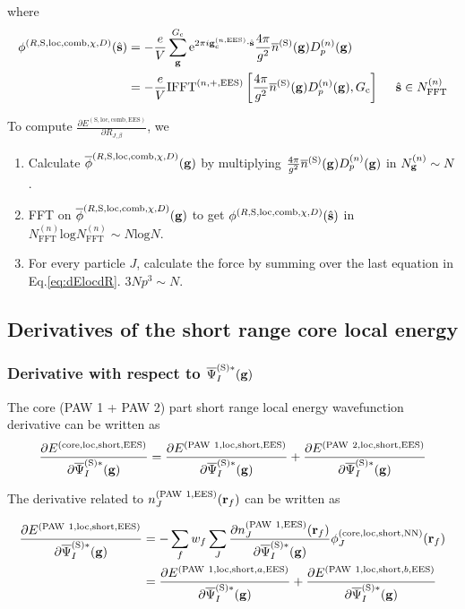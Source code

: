\documentclass[paper=a4, fontsize=11pt]{article} %
\numberwithin{equation}{section} %
\numberwithin{figure}{section} %
\numberwithin{table}{section} %
\newcommand{\p}{\partial}
\newcommand{\ol}{\overline}
\newcommand{\bs}{{\bf{s}}}
\newcommand{\bg}{{\bf{g}}}
\newcommand{\br}{{\bf{r}}}
\newcommand{\hs}{{\hat{\bf{s}}}}
\newcommand{\rS}{{\mathrm{S}}}
\newcommand{\rEES}{{\mathrm{EES}}}
\newcommand{\rcore}{{\mathrm{core}}}
\newcommand{\rNN}{{\mathrm{NN}}}
\newcommand{\re}{{\mathrm{e}}}
\newcommand{\rshort}{{\mathrm{short}}}
\newcommand{\rP}{{\mathrm{PAW}}}
\newcommand{\rcomb}{{\mathrm{comb}}}
\newcommand{\rlo}{{\mathrm{loc}}}
\newcommand{\rl}{{\mathrm{log}}}
\newcommand{\gcnEES}{{\bg_c^{(n,\rEES)}}}
\newcommand{\igcnEESs}{2\pi i\gcnEES\cdot\hat \bs}
\newcommand{\psigsc}{{\overline \Psi_I^{(\rS)*}(\bg)}}
\newcommand{\RJb}{{R_{J,\beta}}}
\newcommand{\NFFTn}{{N^{(n)}_{\mathrm{FFT}}}}
\newcommand{\Ngn}{{N^{(n)}_\bg}}
\newcommand{\Gc}{{G_{\mathrm{c}}}}
\newcommand{\Dng}{{D^{(n)}_p(\bg)}}
\newcommand{\IFFTnEES}{{\mathrm{IFFT}^{(n,+,\rEES)}}}
\newcommand{\hsinn}{{\ \ \ \ \hs \in \NFFTn}}
\begin{document}
where
\begin{equation}
\begin{split}
\phi^{(R,\rS,\rlo,\rcomb,\chi,D)}(\hs)
&= -\frac{e}{V} \sum_{\bg}^\Gc \re^{\igcnEESs} \frac{4\pi}{g^2} \ol{n}^{(\rS)}(\bg) \Dng\\
&= -\frac{e}{V} \IFFTnEES \left[\frac{4\pi}{g^2} \ol{n}^{(\rS)}(\bg) \Dng, \Gc \right] \hsinn
\end{split}
\end{equation}

To compute $\frac{\p E^{(\rS,\rlo,\rcomb,\rEES)}}{ \p \RJb}$, we
\begin{enumerate}
\item Calculate $\ol \phi^{(R,\rS,\rlo,\rcomb,\chi,D)}(\bg)$ by multiplying $\frac{4\pi}{g^2} \ol{n}^{(\rS)}(\bg) \Dng$ in $\Ngn \sim N$.
\item FFT on $\ol \phi^{(R,\rS,\rlo,\rcomb,\chi,D)}(\bg)$ to get $\phi^{(R,\rS,\rlo,\rcomb,\chi,D)}(\hs)$ in $\NFFTn \rl \NFFTn \sim N\rl N$.
\item For every particle $J$, calculate the force by summing over the last equation in Eq.\eqref{eq:dElocdR}. $3 N p^3 \sim N$.
\end{enumerate}




\newpage
\subsection{Derivatives of the short range core local  energy}
\subsubsection{Derivative with respect to $\psigsc$}
The core (PAW 1 + PAW 2) part short range local energy wavefunction derivative can be written as
\begin{equation}
\frac{\p E^{(\rcore,\rlo,\rshort,\rEES)} }{\p \psigsc}
= \frac{\p E^{(\rP\ 1,\rlo,\rshort,\rEES)}}{\p \psigsc}
+ \frac{\p E^{(\rP\ 2,\rlo,\rshort,\rEES)}}{\p \psigsc}
\end{equation}


The derivative related to $n_J^{(\rP\ 1,\rEES)}(\br_f)$ can be written as

\begin{equation}
\begin{split}
\frac{\p E^{(\rP\ 1,\rlo,\rshort,\rEES)}}{\p \psigsc}
&= - \sum_f w_f \sum_J \frac{\p n_J^{(\rP\ 1,\rEES)}(\br_f)}{\p \psigsc}\phi_J^{(\rcore,\rlo,\rshort,\rNN)}(\br_f)\\
&= \frac{\p E^{(\rP\ 1,\rlo,\rshort,a,\rEES)}}{\p \psigsc}+\frac{\p E^{(\rP\ 1,\rlo,\rshort,b,\rEES)}}{\p \psigsc} \\
\end{split}
\end{equation}
\end{document}
